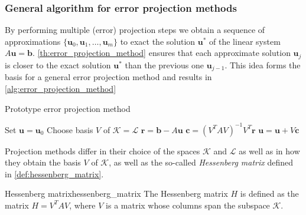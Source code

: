 \subsubsection{General algorithm for error projection methods}
By performing multiple (error) projection steps we obtain a sequence of approximations $\{\mathbf{u}_0, \mathbf{u}_1, \dots, \mathbf{u}_m\}$ to exact the solution $\mathbf{u}^*$ of the linear system $A\mathbf{u} = \mathbf{b}$. \cref{th:error_projection_method} ensures that each approximate solution $\mathbf{u}_j$ is closer to the exact solution $\mathbf{u}^*$ than the previous one $\mathbf{u}_{j-1}$. This idea forms the basis for a general error projection method and results in \cref{alg:error_projection_method}
\begin{algorithm}[H]
  \caption{Prototype error projection method \cite[Algorithm 5.1]{iter_method_saad}}
  \begin{algorithmic}
    \State Set $\mathbf{u} = \mathbf{u}_0$
    \State Choose basis $V$ of $\mathcal{K}=\mathcal{L}$
    \State $\mathbf{r} = \mathbf{b} - A \mathbf{u}$
    \State $\mathbf{c} = (V^TAV)^{-1}V^T\mathbf{r}$
    \State $\mathbf{u} = \mathbf{u} + V\mathbf{c}$
    \EndWhile
  \end{algorithmic}
  \label{alg:error_projection_method}
\end{algorithm}
Projection methods differ in their choice of the spaces $\mathcal{K}$ and $\mathcal{L}$ as well as in how they obtain the basis $V$ of $\mathcal{K}$, as well as the so-called \textit{Hessenberg matrix} defined in \cref{def:hessenberg_matrix}.
\begin{fancydef}{Hessenberg matrix}{hessenberg_matrix}
  The Hessenberg matrix $H$ is defined as the matrix $H = V^TAV$, where $V$ is a matrix whose columns span the subspace $\mathcal{K}$.
\end{fancydef}


